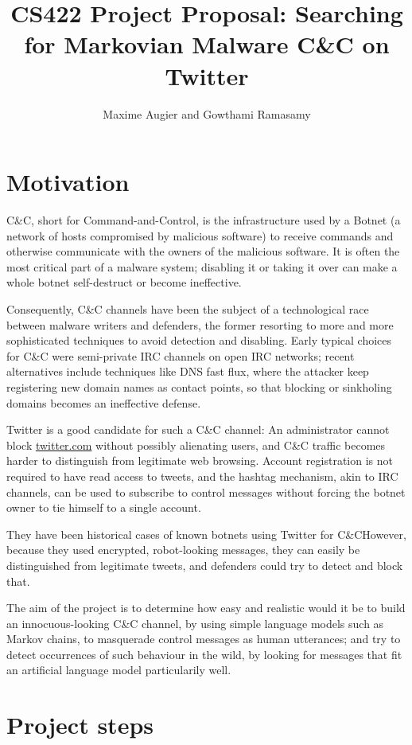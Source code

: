 \documentclass[a4paper,11pt]{article}
\title{CS422 Project Proposal: Searching for Markovian Malware C\&C on Twitter}
\author{Maxime Augier and Gowthami Ramasamy}
\begin{document}
\maketitle



\section{Motivation}

C\&C, short for Command-and-Control, is the infrastructure used by a Botnet (a network of hosts compromised by malicious software) to receive
commands and otherwise communicate with the owners of the malicious software. It is often the most critical part of a malware system; disabling it or taking it over can make a whole botnet self-destruct or become ineffective.

Consequently, C\&C channels have been the subject of a technological race between malware writers and defenders, the former resorting to more and more sophisticated techniques to avoid detection and disabling. Early typical choices for C\&C were semi-private IRC channels on open IRC networks; recent alternatives include techniques like DNS fast flux, where the attacker keep registering new domain names as contact points, so that blocking or sinkholing domains becomes an ineffective defense.

Twitter is a good candidate for such a C\&C channel: An administrator cannot block \url{twitter.com} without possibly alienating users, and C\&C traffic becomes harder to distinguish from legitimate web browsing. Account registration is not required to have read access to tweets, and the hashtag mechanism, akin to IRC channels, can be used to subscribe to control messages without forcing the botnet owner to tie himself to a single account. 

They have been historical cases of known botnets using Twitter for C\&CHowever, because they used encrypted, robot-looking messages, they can easily be distinguished from legitimate tweets, and defenders could try to detect and block that.

The aim of the project is to determine how easy and realistic would it be to build an innocuous-looking C\&C channel, by using simple language models such as Markov chains, to masquerade control messages as human utterances; and try to detect occurrences of such behaviour in the wild, by looking for messages that fit an artificial language model particularily well.


\section{Project steps}
\end{document}
